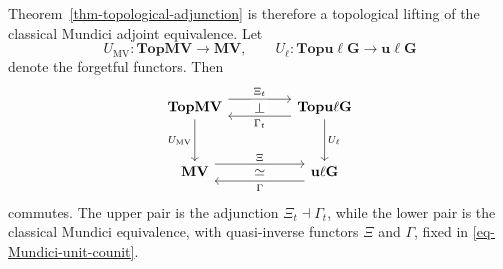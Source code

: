 \documentclass[preprint,3p]{elsarticle}
\theoremstyle{plain}
\theoremstyle{definition}
\newcommand{\TopMV}{\mathbf{TopMV}}
\newcommand{\Topulg}{\mathbf{Topu\ell G}}
\newcommand{\uLG}{\mathbf{u\ell G}}
\newcommand{\MV}{\mathbf{MV}}
\numberwithin{equation}{section}
\begin{document}
Theorem~\ref{thm-topological-adjunction} is therefore a topological lifting
of the classical Mundici adjoint equivalence.  Let
\[
 U_{\mathrm{MV}}\colon\TopMV\longrightarrow\MV,
 \qquad
 U_{\ell}\colon\Topulg\longrightarrow\uLG
\]
denote the forgetful functors.  Then
\begin{equation}
\label{eq-topological-lifting-square}
\begin{tikzcd}[column sep=4.5em,row sep=3em]
\TopMV
  \arrow[r,shift left=1.4ex,"\Xi_t"]
  \arrow[r,phantom,"\bot" description]
  \arrow[d,"U_{\mathrm{MV}}"']
&
\Topulg
  \arrow[l,shift left=1.4ex,"\Gamma_t"]
  \arrow[d,"U_{\ell}"]
\\
\MV
  \arrow[r,shift left=1.4ex,"\Xi"]
  \arrow[r,phantom,"\simeq" description]
&
\uLG
  \arrow[l,shift left=1.4ex,"\Gamma"]
\end{tikzcd}
\end{equation}
commutes.  The upper pair is the adjunction
$\Xi_t\dashv\Gamma_t$, while the lower pair is the classical Mundici
equivalence, with quasi-inverse functors $\Xi$ and $\Gamma$, fixed in
\eqref{eq-Mundici-unit-counit}.
\end{document}
